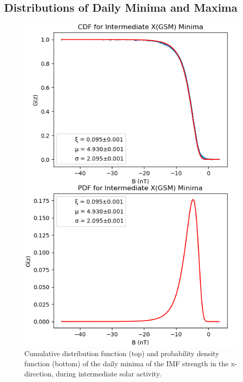 \documentclass[12pt]{article}
\begin{document}
    \subsection{Distributions of Daily Minima and Maxima}\label{sec:dailydist}
        \begin{figure}[t!]
            \begin{minipage}{0.48\textwidth}
                \centering
                \includegraphics[width=\textwidth]{fig_method/MFIintXmin.png}
                \caption{Cumulative distribution function (top) and probability density function (bottom) of the daily minima of the IMF strength in the x-direction, during intermediate solar activity.}
                \label{fig:MFIintXmin}
            \end{minipage}
            \hfill

\end{figure}
\end{document}

